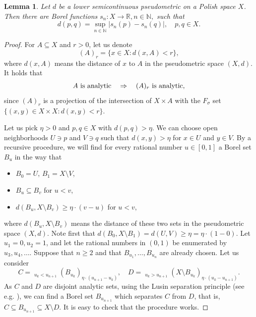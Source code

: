\documentclass[a4paper]{amsart}
\theoremstyle{plain}
\newtheorem{lemma}[theorem]{Lemma}
\theoremstyle{remark}
\begin{document}
\begin{lemma} \label{lemmalscpseud}
Let $ d $ be a lower semicontinuous pseudometric on a Polish space $ X $. Then there are Borel functions $ s_{n} : X \to \mathbb{R}, n \in \mathbb{N}, $ such that
$$ d(p, q) = \sup_{n \in \mathbb{N}} |s_{n}(p) - s_{n}(q)|, \quad p, q \in X. $$
\end{lemma}

\begin{proof}
For $ A \subseteq X $ and $ r > 0 $, let us denote
$$ (A)_{r} = \{ x \in X : d(x, A) < r \}, $$
where $ d(x, A) $ means the distance of $ x $ to $ A $ in the pseudometric space $ (X, d) $. It holds that
$$ \textrm{$ A $ is analytic} \quad \Rightarrow \quad \textrm{$ (A)_{r} $ is analytic}, $$
since $ (A)_{r} $ is a projection of the intersection of $ X \times A $ with the $ F_{\sigma} $ set $ \{ (x, y) \in X \times X : d(x, y) < r \} $.

Let us pick $ \eta > 0 $ and $ p, q \in X $ with $ d(p, q) > \eta $. We can choose open neighborhoods $ U \ni p $ and $ V \ni q $ such that $ d(x, y) > \eta $ for $ x \in U $ and $ y \in V $. By a recursive procedure, we will find for every rational number $ u \in [0, 1] $ a Borel set $ B_{u} $ in the way that
\begin{itemize}
\item $ B_{0} = U $, $ B_{1} = X \setminus V $,
\item $ B_{u} \subseteq B_{v} $ for $ u < v $,
\item $ d(B_{u}, X \setminus B_{v}) \geq \eta \cdot (v - u) $ for $ u < v $,
\end{itemize}
where $ d(B_{u}, X \setminus B_{v}) $ means the distance of these two sets in the pseudometric space $ (X, d) $. Note first that $ d(B_{0}, X \setminus B_{1}) = d(U, V) \geq \eta = \eta \cdot (1 - 0) $. Let $ u_{1} = 0, u_{2} = 1 $, and let the rational numbers in $ (0, 1) $ be enumerated by $ u_{3}, u_{4}, \dots $. Suppose that $ n \geq 2 $ and that $ B_{u_{1}}, \dots, B_{u_{n}} $ are already chosen. Let us consider	$$ C = \mathop{\bigcup_{1 \leq k \leq n}}_{u_{k} < u_{n+1}} (B_{u_{k}})_{\eta \cdot (u_{n+1}-u_{k})}, \quad D = \mathop{\bigcup_{1 \leq k \leq n}}_{u_{k} > u_{n+1}} (X \setminus B_{u_{k}})_{\eta \cdot (u_{k}-u_{n+1})}. $$
As $ C $ and $ D $ are disjoint analytic sets, using the Lusin separation principle (see e.g. \cite[Theorem~14.7]{kechris}), we can find a Borel set $ B_{u_{n+1}} $ which separates $ C $ from $ D $, that is, $ C \subseteq B_{u_{n+1}} \subseteq X \setminus D $. It is easy to check that the procedure works.


\end{proof}
\end{document}
